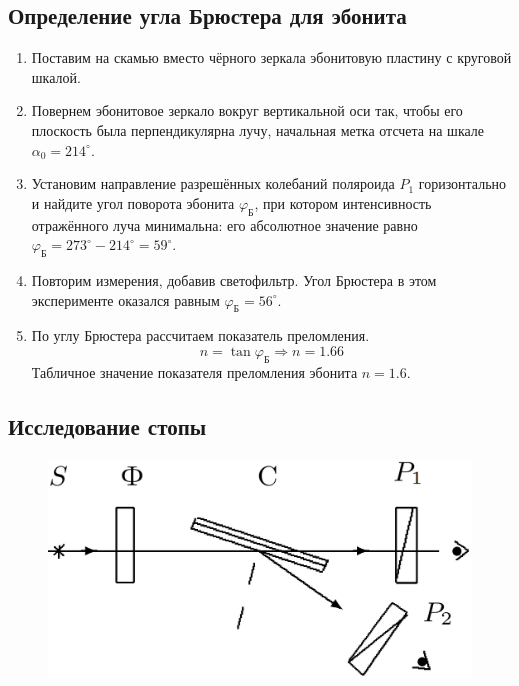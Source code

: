 	\subsection*{Определение угла Брюстера для эбонита}
	\begin{enumerate}
		\item Поставим на скамью вместо чёрного зеркала эбонитовую пластину с круговой шкалой.
		
		\item  Повернем эбонитовое зеркало вокруг вертикальной оси так, чтобы его
		плоскость была перпендикулярна лучу, начальная метка отсчета на шкале $\alpha_0 = 214^{\circ}$.
		
		\item Установим направление разрешённых колебаний поляроида $P_1$ горизонтально и найдите угол поворота эбонита $\varphi_{\text{Б}}$, при котором интенсивность отражённого луча минимальна: его абсолютное значение равно $\varphi_{\text{Б}} = 273^{\circ} - 214^{\circ} = 59^{\circ}$.
		
		\item Повторим измерения, добавив светофильтр. Угол Брюстера в этом эксперименте оказался равным $\varphi_{\text{Б}} = 56^{\circ}$.
		
		\item По углу Брюстера рассчитаем показатель преломления.
		\begin{equation}
			n = \tan \varphi_{\text{Б}} \Rightarrow n = 1.66
		\end{equation}
		Табличное значение показателя преломления эбонита $n = 1.6$.
		
	\end{enumerate}

	\subsection*{Исследование стопы}
	
	\begin{figure}
		\centering
		\includegraphics[width=0.5\textheight]{./images/III.png}
		\caption{}
	\end{figure}
	
